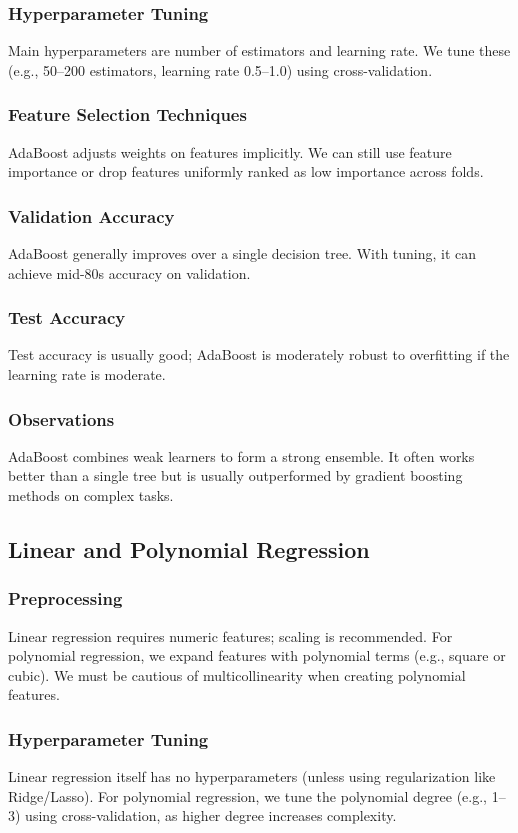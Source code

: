 \documentclass[12pt]{article}
\begin{document}
\subsubsection{Hyperparameter Tuning}
Main hyperparameters are number of estimators and learning rate. We tune these (e.g., 50--200 estimators, learning rate 0.5--1.0) using cross-validation.
\subsubsection{Feature Selection Techniques}
AdaBoost adjusts weights on features implicitly. We can still use feature importance or drop features uniformly ranked as low importance across folds.
\subsubsection{Validation Accuracy}
AdaBoost generally improves over a single decision tree. With tuning, it can achieve mid-80s accuracy on validation.
\subsubsection{Test Accuracy}
Test accuracy is usually good; AdaBoost is moderately robust to overfitting if the learning rate is moderate.
\subsubsection{Observations}
AdaBoost combines weak learners to form a strong ensemble. It often works better than a single tree but is usually outperformed by gradient boosting methods on complex tasks.

\subsection{Linear and Polynomial Regression}
\subsubsection{Preprocessing}
Linear regression requires numeric features; scaling is recommended. For polynomial regression, we expand features with polynomial terms (e.g., square or cubic). We must be cautious of multicollinearity when creating polynomial features.
\subsubsection{Hyperparameter Tuning}
Linear regression itself has no hyperparameters (unless using regularization like Ridge/Lasso). For polynomial regression, we tune the polynomial degree (e.g., 1--3) using cross-validation, as higher degree increases complexity.
\end{document}
